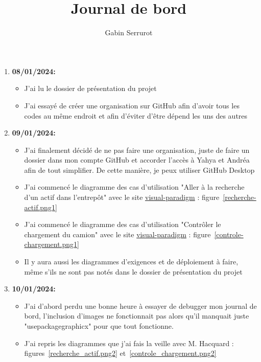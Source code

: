 \documentclass[10pt,a4paper]{article}
\title{Journal de bord}
\author{Gabin Serrurot}
\begin{document}
\maketitle

\begin{enumerate}
    \item \textbf{08/01/2024:}
        \begin{itemize}
            \item J'ai lu le dossier de présentation du projet
            \item J'ai essayé de créer une organisation sur GitHub afin d'avoir tous les codes au même endroit et afin d'éviter d'être dépend les uns des autres
        \end{itemize}
    \item \textbf{09/01/2024:}
        \begin{itemize}
            \item J'ai finalement décidé de ne pas faire une organisation, juste de faire un dossier dans mon compte GitHub et accorder l'accès à Yahya et Andréa afin de tout simplifier. De cette manière, je peux utiliser GitHub Desktop
            \item J'ai commencé le diagramme des cas d'utilisation "Aller à la recherche d’un actif dans l’entrepôt" avec le site \href{https://online.visual-paradigm.com}{visual-paradigm} : figure~\ref{recherche-actif.png1}
            \item J'ai commencé le diagramme des cas d'utilisation "Contrôler le chargement du camion" avec le site \href{https://online.visual-paradigm.com}{visual-paradigm} : figure~\ref{controle-chargement.png1}
            \item Il y aura aussi les diagrammes d'exigences et de déploiement à faire, même s'ils ne sont pas notés dans le dossier de présentation du projet
        \end{itemize}
    \item \textbf{10/01/2024:}
        \begin{itemize}
            \item J'ai d'abord perdu une bonne heure à essayer de debugger mon journal de bord, l'inclusion d'images ne fonctionnait pas alors qu'il manquait juste "usepackage{graphicx}" pour que tout fonctionne.
            \item J'ai repris les diagrammes que j'ai fais la veille avec M. Hacquard : figures~\ref{recherche_actif.png2} et~\ref{controle_chargement.png2} 
        \end{itemize}

\end{enumerate}
\end{document}
